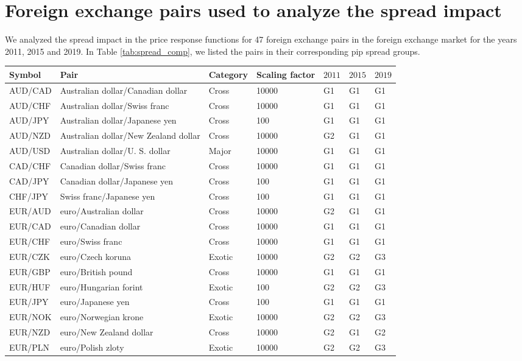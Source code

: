 \section{Foreign exchange pairs used to analyze the spread impact}
\label{app:fx_pairs_spread}

We analyzed the spread impact in the price response functions for 47 foreign
exchange pairs in the foreign exchange market for the years 2011, 2015 and
2019. In Table \ref{tab:spread_comp}, we listed the pairs in their corresponding pip spread groups.

\begin{table*}
\begin{center}
\begin{centering}
    \begin{threeparttable}
    \caption{Foreign exchange pairs used in Sect. \ref{sec:spread_impact}.}
    \label{tab:spread_comp}
    \begin{tabular}{lllllll}
    \hline
    Symbol & Pair & Category & Scaling factor & $2011$ & $2015$ & $2019$\tabularnewline
    \hline
    AUD/CAD & Australian dollar/Canadian dollar & Cross & 10000 & G1 & G1 & G1\tabularnewline
    AUD/CHF & Australian dollar/Swiss franc & Cross & 10000 & G1 & G1 & G1\tabularnewline
    AUD/JPY & Australian dollar/Japanese yen & Cross & 100 & G1 & G1 & G1\tabularnewline
    AUD/NZD & Australian dollar/New Zealand dollar & Cross & 10000 & G2 & G1 & G1\tabularnewline
    AUD/USD & Australian dollar/U. S. dollar & Major & 10000 & G1 & G1 & G1\tabularnewline
    CAD/CHF & Canadian dollar/Swiss franc & Cross & 10000 & G1 & G1 & G1\tabularnewline
    CAD/JPY & Canadian dollar/Japanese yen & Cross & 100 & G1 & G1 & G1\tabularnewline
    CHF/JPY & Swiss franc/Japanese yen & Cross & 100 & G1 & G1 & G1\tabularnewline
    EUR/AUD & euro/Australian dollar & Cross & 10000 & G2 & G1 & G1\tabularnewline
    EUR/CAD & euro/Canadian dollar & Cross & 10000 & G1 & G1 & G1\tabularnewline
    EUR/CHF & euro/Swiss franc & Cross & 10000 & G1 & G1 & G1\tabularnewline
    EUR/CZK & euro/Czech koruna & Exotic & 10000 & G2 & G2 & G3\tabularnewline
    EUR/GBP & euro/British pound & Cross & 10000 & G1 & G1 & G1\tabularnewline
    EUR/HUF & euro/Hungarian forint & Exotic & 100 & G2 & G2 & G3\tabularnewline
    EUR/JPY & euro/Japanese yen & Cross & 100 & G1 & G1 & G1\tabularnewline
    EUR/NOK & euro/Norwegian krone & Exotic & 10000 & G2 & G2 & G3\tabularnewline
    EUR/NZD & euro/New Zealand dollar & Cross & 10000 & G2 & G1 & G2\tabularnewline
    EUR/PLN & euro/Polish zloty & Exotic & 10000 & G2 & G2 & G3\tabularnewline

\end{tabular}
\end{threeparttable}
\end{centering}
\end{center}
\end{table*}
